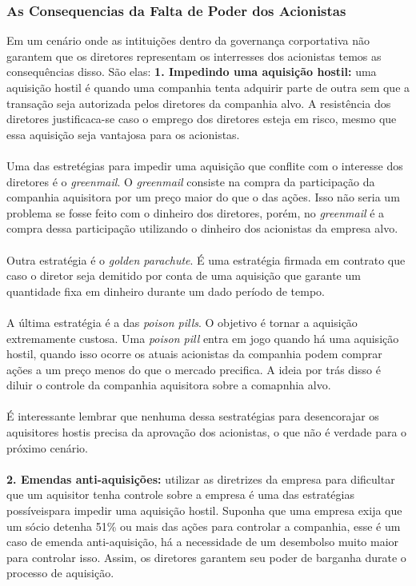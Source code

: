 \subsubsection*{As Consequencias da Falta de Poder dos Acionistas}
Em um cenário onde as intituições dentro da governança corportativa não garantem que os diretores representam os interresses dos acionistas temos as consequências disso. São elas:
\textbf{1. Impedindo uma aquisição hostil:} uma aquisição hostil é quando uma companhia tenta adquirir parte de outra sem que a transação seja autorizada pelos diretores da companhia alvo. A resistência dos diretores justificaca-se caso o emprego dos diretores esteja em risco, mesmo que essa aquisição seja vantajosa para os acionistas.
\\~\\
Uma das estretégias para impedir uma aquisição que conflite com o interesse dos diretores é o \textit{greenmail}. O \textit{greenmail} consiste na compra da participação da companhia aquisitora por um preço maior do que o das ações. Isso não seria um problema se fosse feito com o dinheiro dos diretores, porém, no \textit{greenmail} é a compra dessa participação utilizando o dinheiro dos acionistas da empresa alvo.
\\~\\
Outra estratégia é o \textit{golden parachute}. É uma estratégia firmada em contrato que caso o diretor seja demitido por conta de uma aquisição que garante um quantidade fixa em dinheiro durante um dado período de tempo.
\\~\\
A última estratégia é a das \textit{poison pills}. O objetivo é tornar a aquisição extremamente custosa. Uma \textit{poison pill} entra em jogo quando há uma aquisição hostil, quando isso ocorre os atuais acionistas da companhia podem comprar ações a um preço menos do que o mercado precifica. A ideia por trás disso é diluir o controle da companhia aquisitora sobre a comapnhia alvo.
\\~\\
É interessante lembrar que nenhuma dessa sestratégias para desencorajar os aquisitores hostis precisa da aprovação dos acionistas, o que não é verdade para o próximo cenário.
\\~\\
\textbf{2. Emendas anti-aquisições:} utilizar as diretrizes da empresa para dificultar que um aquisitor tenha controle sobre a empresa é  uma das estratégias possíveispara impedir uma aquisição hostil. Suponha que uma empresa exija que um sócio detenha 51\% ou mais das ações para controlar a companhia, esse é um caso de emenda anti-aquisição, há a necessidade de um desembolso muito maior para controlar isso. Assim, os diretores garantem seu poder de barganha durate o processo de aquisição.
